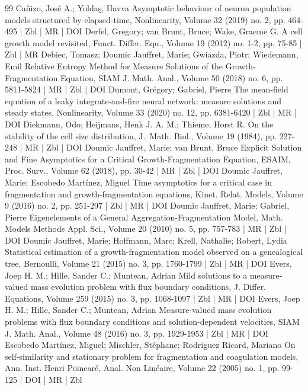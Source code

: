 \documentclass[10pt]{amsart}
\theoremstyle{definition}\newtheorem{defi}[theo]{Definition}\newtheorem{rema}[theo]{Remark}\newtheorem{exam}[theo]{Example}\newtheorem{exem}[theo]{Example}\newtheorem{nota}[theo]{Notation}
\newcommand{\1}{\mathds{1}}
\begin{document}
\begin{thebibliography}{99}
Cañizo, José A.; Yoldaş, Havva Asymptotic behaviour of neuron population models structured by elapsed-time, Nonlinearity, Volume 32 (2019) no. 2, pp. 464-495 | Zbl | MR | DOI
Derfel, Gregory; van Brunt, Bruce; Wake, Graeme G. A cell growth model revisited, Funct. Differ. Equ., Volume 19 (2012) no. 1-2, pp. 75-85 | Zbl | MR
Debiec, Tomasz; Doumic Jauffret, Marie; Gwiazda, Piotr; Wiedemann, Emil Relative Entropy Method for Measure Solutions of the Growth-Fragmentation Equation, SIAM J. Math. Anal., Volume 50 (2018) no. 6, pp. 5811-5824 | MR | Zbl | DOI
Dumont, Grégory; Gabriel, Pierre The mean-field equation of a leaky integrate-and-fire neural network: measure solutions and steady states, Nonlinearity, Volume 33 (2020) no. 12, pp. 6381-6420 | Zbl | MR | DOI
Diekmann, Odo; Heijmans, Henk J. A. M.; Thieme, Horst R. On the stability of the cell size distribution, J. Math. Biol., Volume 19 (1984), pp. 227-248 | MR | Zbl | DOI
Doumic Jauffret, Marie; van Brunt, Bruce Explicit Solution and Fine Asymptotics for a Critical Growth-Fragmentation Equation, ESAIM, Proc. Surv., Volume 62 (2018), pp. 30-42 | MR | Zbl | DOI
Doumic Jauffret, Marie; Escobedo Martínez, Miguel Time asymptotics for a critical case in fragmentation and growth-fragmentation equations, Kinet. Relat. Models, Volume 9 (2016) no. 2, pp. 251-297 | Zbl | MR | DOI
Doumic Jauffret, Marie; Gabriel, Pierre Eigenelements of a General Aggregation-Fragmentation Model, Math. Models Methods Appl. Sci., Volume 20 (2010) no. 5, pp. 757-783 | MR | Zbl | DOI
Doumic Jauffret, Marie; Hoffmann, Marc; Krell, Nathalie; Robert, Lydia Statistical estimation of a growth-fragmentation model observed on a genealogical tree, Bernoulli, Volume 21 (2015) no. 3, pp. 1760-1799 | Zbl | MR | DOI
Evers, Joep H. M.; Hille, Sander C.; Muntean, Adrian Mild solutions to a measure-valued mass evolution problem with flux boundary conditions, J. Differ. Equations, Volume 259 (2015) no. 3, pp. 1068-1097 | Zbl | MR | DOI
Evers, Joep H. M.; Hille, Sander C.; Muntean, Adrian Measure-valued mass evolution problems with flux boundary conditions and solution-dependent velocities, SIAM J. Math. Anal., Volume 48 (2016) no. 3, pp. 1929-1953 | Zbl | MR | DOI
Escobedo Martínez, Miguel; Mischler, Stéphane; Rodriguez Ricard, Mariano On self-similarity and stationary problem for fragmentation and coagulation models, Ann. Inst. Henri Poincaré, Anal. Non Linéaire, Volume 22 (2005) no. 1, pp. 99-125 | DOI | MR | Zbl

\end{thebibliography}
\end{document}
